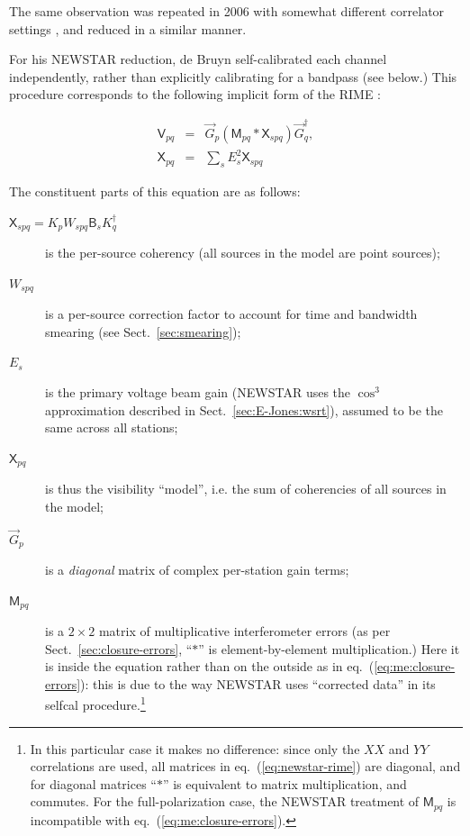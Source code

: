 \documentclass[]{aa}
\newcommand{\jones}[2]{\vec {#1}_{#2}}
\newcommand{\jonesT}[2]{\vec {#1}^\dagger_{#2}}
\newcommand{\coh}[2]{\mathsf{{#1}}_{{#2}}}
\begin{document}
The same observation was repeated in 2006 with somewhat different correlator settings \citep[for details, see]{deBruyn:3C147}, and reduced in a similar manner.

For his NEWSTAR reduction, de Bruyn self-calibrated each channel independently, rather than explicitly calibrating for a bandpass (see below.) This procedure corresponds to the following implicit form of the RIME :

\begin{eqnarray}\label{eq:newstar-rime}
\coh{V}{pq} & = & \jones{G}{p} \left ( \coh{M}{pq} \ast \coh{X}{spq} \right ) \jonesT{G}{q}, \\
\nonumber \coh{X}{pq} & = & \sum_{s} E^2_s \coh{X}{spq} 
\end{eqnarray}

The constituent parts of this equation are as follows:
\begin{description}
\item[$\coh{X}{spq}=K_p W_{spq} \coh{B}{s} K^\dagger_q$] is the per-source coherency (all sources in the model are point sources);
\item[$W_{spq}$] is a per-source correction factor to account for time and bandwidth smearing (see Sect.~\ref{sec:smearing});

\item[$E_s$] is the primary voltage beam gain (NEWSTAR uses the $\cos^3$ approximation described in Sect.~\ref{sec:E-Jones:wsrt}), assumed to be the same across all stations;

\item[$\coh{X}{pq}$] is thus the visibility ``model'', i.e. the sum of coherencies of all sources in the model;

\item[$\jones{G}{p}$] is a {\em diagonal} matrix of complex per-station gain terms;

\item[$\coh{M}{pq}$] is a $2\times2$ matrix of multiplicative interferometer errors (as per Sect.~\ref{sec:closure-errors}, ``$\ast$'' is element-by-element multiplication.) Here it is inside the equation rather than on the outside as in eq.~(\ref{eq:me:closure-errors}): this is due to the way NEWSTAR uses ``corrected data'' in its selfcal procedure.\footnote{In this particular case it makes no difference: since only the $XX$ and $YY$ correlations are used, all matrices in eq.~(\ref{eq:newstar-rime}) are diagonal, and for diagonal matrices ``$\ast$'' is equivalent to matrix multiplication, and commutes. For the full-polarization case, the NEWSTAR treatment of $\coh{M}{pq}$ is incompatible with eq.~(\ref{eq:me:closure-errors}).}

\end{description}
\end{document}
